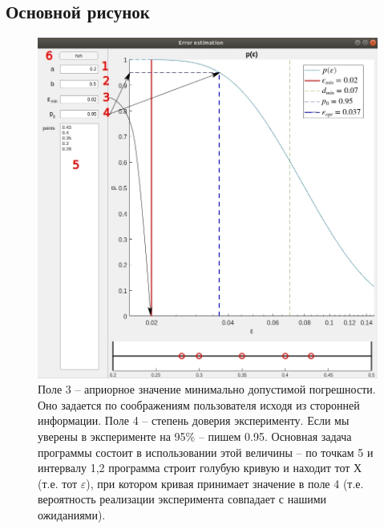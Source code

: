 \documentclass[a4paper,12pt]{article} %
\begin{document}
\newpage

\subsection{Основной рисунок}

\begin{figure}[h!]
\begin{center}
\includegraphics[width=1\textwidth]{./pics/whole_window_34}
\end{center}
\caption{Поле 3 -- априорное значение минимально допустимой погрешности. Оно задается по соображениям пользователя исходя из сторонней информации. Поле 4 -- степень доверия эксперименту. Если мы уверены в эксперименте на 95\% -- пишем 0.95. Основная задача программы состоит в использовании этой величины -- по точкам 5 и интервалу 1,2 программа строит голубую кривую и находит тот Х (т.е. тот $\varepsilon$), при котором кривая принимает значение в поле 4 (т.е. вероятность реализации эксперимента совпадает с нашими ожиданиями).} 
\label{img:whole_34}
\end{figure}

\newpage
\end{document}
